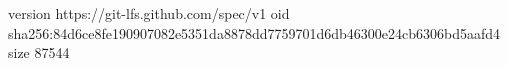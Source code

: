 version https://git-lfs.github.com/spec/v1
oid sha256:84d6ce8fe190907082e5351da8878dd7759701d6db46300e24cb6306bd5aafd4
size 87544
